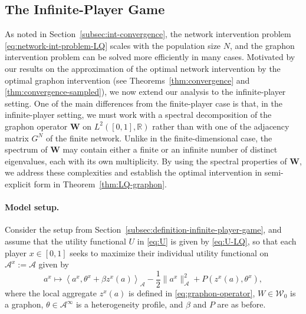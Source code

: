 \documentclass[11pt]{article}
\def\al{\alpha}
\def\P{\mathbb{P}}
\newcommand{\be}{\begin{equation}}
\newcommand{\ee}{\end{equation}}
\newtheorem{corollary}[theorem]{Corollary}
\numberwithin{equation}{section}
\begin{document}


\subsection{The Infinite-Player Game}

As noted in Section~\ref{subsec:int-convergence}, the network intervention problem \eqref{eq:network-int-problem-LQ} scales with the population size $N$, and the graphon intervention problem can be solved more efficiently in many cases. Motivated by our results on the approximation of the optimal network intervention by the optimal graphon intervention (see Theorems~\ref{thm:convergence} and \ref{thm:convergence-sampled}), we now extend our analysis to the infinite-player setting. One of the main differences from the finite-player case is that, in the infinite-player setting, we must work with a spectral decomposition of the graphon operator $\boldsymbol{W}$ on $L^2([0,1], \mathbb{R})$ rather than with one of the adjacency matrix $G^N$ of the finite network. Unlike in the finite-dimensional case, the spectrum of $\boldsymbol{W}$ may contain either a finite or an infinite number of distinct eigenvalues, each with its own multiplicity. By using the spectral properties of $\boldsymbol{W}$, we address these complexities and establish the optimal intervention in semi-explicit form in Theorem~\ref{thm:LQ-graphon}.

\paragraph{Model setup.} 
Consider the setup from Section~\ref{subsec:definition-infinite-player-game}, and assume that the utility functional $U$ in \eqref{eq:U} is given by \eqref{eq:U-LQ},
so that each player $x\in[0,1]$ seeks to maximize their individual utility functional on $\mathcal{A}^x:=\mathcal{A}$ given by
\be \label{eq:Ux-LQ}
a^x\mapsto \left\langle a^x,\theta^x+\beta z^x(a)\right\rangle_{\mathcal{A}}-\frac{1}{2}\| a^x\|^2_{\mathcal{A}}+P\left(z^x(a),\theta^x\right),
\ee 
where the local aggregate $z^x(a)$ is defined in \eqref{eq:graphon-operator}, $W\in\mathcal{W}_0$ is a graphon, $\theta\in\mathcal{A}^\infty$ is a heterogeneity profile, and $\beta$ and $P$ are as before.
\end{document}
